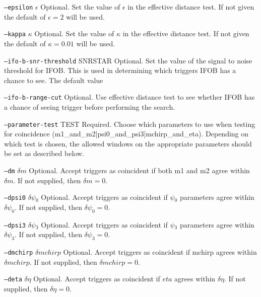 \begin{entry}
\begin{entry}
\item[\texttt{--epsilon} \textsc{$\epsilon$}] Optional. Set the value of
$\epsilon$ in the effective distance test. If not given the default of
$\epsilon = 2$ will be used.

\item[\texttt{--kappa} \textsc{$\kappa$}] Optional. Set the value of
$\kappa$ in the effective distance test. If not given the default of
$\kappa= 0.01$ will be used.

\item[\texttt{--ifo-b-snr-threshold} \textsc{SNRSTAR}] Optional.  Set the 
value of the signal to noise threshold for \textsc{IFOB}.  This is used in
determining which triggers \textsc{IFOB} has a chance to see.  The default
value 

\item[\texttt{--ifo-b-range-cut}] Optional.  Use effective distance test to
see whether \textsc{IFOB} has a chance of seeing trigger before performing 
the search.

\item[\texttt{--parameter-test} TEST] Required. Choose which parameters to use 
when testing for coincidence (m1\_and\_m2|psi0\_and\_psi3|mchirp\_and\_eta).  
Depending on which test is chosen, the allowed windows on the appropriate 
parameters should be set as described below.

\item[\texttt{--dm} \textsc{$\delta m$}] Optional. Accept triggers as
coincident if both m1 and m2 agree within $\delta m$.  If not
supplied,  then $\delta m = 0$.

\item[\texttt{--dpsi0} \textsc{$\delta \psi_0$}] Optional. Accept triggers as
coincident if \textsc{$\psi_0$} parameters agree within $\delta \psi_0$.  If not
supplied,  then $\delta  \psi_0 = 0$.

\item[\texttt{--dpsi3} \textsc{$\delta \psi_3$}] Optional. Accept triggers as
coincident if \textsc{$\psi_3$} parameters agree within $\delta \psi_3$. 
 If not supplied,  then $\delta  \psi_3 = 0$.

\item[\texttt{--dmchirp} \textsc{$\delta mchirp$}] Optional. Accept triggers as
coincident if mchirp agrees within $\delta mchirp$.  If not
supplied,  then $\delta mchirp = 0$.

\item[\texttt{--deta} \textsc{$\delta \eta$}] Optional. Accept triggers as
coincident if $eta$ agrees within $\delta \eta$.  If not
supplied,  then $\delta \eta = 0$.


\end{entry}
\end{entry}
